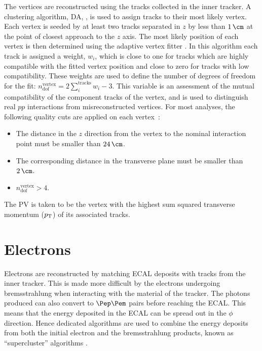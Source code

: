 The vertices are reconstructed using the tracks collected in the inner
tracker. A clustering algorithm, \ac{DA},
\cite{DetAnnealing}, is used to assign tracks to their most likely 
vertex. Each vertex is seeded by at least two tracks separated in $z$ by less than
$1\,\cm$ at the point of closest approach to the $z$ axis.
The most likely position of each vertex is then determined using the
adaptive vertex fitter \cite{adaptivevertex}. In
this algorithm each track is assigned a weight, $w_{i}$, which is close to one for tracks which
are highly compatible with the fitted vertex position and close to zero for tracks with low
compatibility. These weights are used to define the number of degrees of freedom
for the fit: $n_{\text{dof}}^{\text{vertex}} = 2\sum_{i}^{\text{tracks}}w_{i}-3$. This
variable is an assessment of the mutual compatibility of the component tracks of
the vertex, and is used to distinguish real $pp$ interactions from
misreconstructed vertices. For most analyses, the following quality cuts are
applied on each vertex~\cite{CMS-PAS-TRK-10-005}:
\begin{itemize}
\item The distance in the $z$ direction from the vertex to the nominal interaction
point must be smaller than $24\,\cm$. 
\item The corresponding distance in the transverse plane must be smaller than
$2\,\cm$.
\item $n_{\text{dof}}^{\text{vertex}} > 4$.
\end{itemize}

The \ac{PV} is taken to be the vertex with the highest sum squared transverse
momentum ($p_{\mathrm{T}}$) of its associated tracks. 

\section{Electrons}
\label{sec:electrons}

Electrons are reconstructed by matching \ac{ECAL} deposits with tracks from the
inner tracker. This is made more difficult by the electrons
undergoing bremsstrahlung when interacting with the material of the tracker.
The photons produced can also convert to $\Pep\Pem$ pairs before
reaching the \ac{ECAL}. This means that the energy deposited in the \ac{ECAL} 
can be spread out in the $\phi$ direction. Hence dedicated algorithms are used
to combine the energy deposits from both the initial electron and the
bremsstrahlung products, known as ``supercluster'' algorithms \cite{ElectronReco}.

